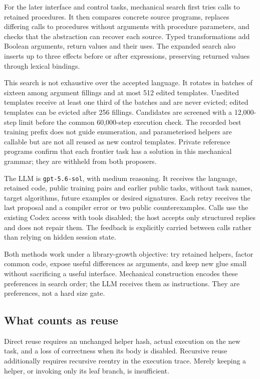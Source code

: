 For the later interface and control tasks, mechanical search first tries calls
to retained procedures. It then compares concrete source programs, replaces
differing calls to procedures without arguments with procedure parameters, and
checks that the abstraction can recover each source. Typed transformations add
Boolean arguments, return values and their uses. The expanded search also
inserts up to three effects before or after expressions, preserving returned
values through lexical bindings.

This search is not exhaustive over the accepted language. It rotates in batches
of sixteen among argument fillings and at most 512 edited templates. Unedited
templates receive at least one third of the batches and are never evicted;
edited templates can be evicted after 256 fillings. Candidates are screened
with a 12,000-step limit before the common 60,000-step execution check. The
recorded best training prefix does not guide enumeration, and parameterised
helpers are callable but are not all reused as new control templates. Private
reference programs confirm that each frontier task has a solution in this
mechanical grammar; they are withheld from both proposers.

The LLM is \texttt{gpt-5.6-sol}, with medium reasoning. It receives the language,
retained code, public training pairs and earlier public tasks, without task
names, target algorithms, future examples or desired signatures. Each retry
receives the last proposal and a compiler error or two public counterexamples.
Calls use the existing Codex access with tools disabled; the host accepts only
structured replies and does not repair them. The feedback is explicitly carried
between calls rather than relying on hidden session state.

Both methods work under a library-growth objective: try retained helpers,
factor common code, expose useful differences as arguments, and keep new glue
small without sacrificing a useful interface. Mechanical construction encodes
these preferences in search order; the LLM receives them as instructions.
They are preferences, not a hard size gate.

\subsection{What counts as reuse}

Direct reuse requires an unchanged helper hash, actual execution on the new
task, and a loss of correctness when its body is disabled. Recursive reuse
additionally requires recursive reentry in the execution trace. Merely keeping
a helper, or invoking only its leaf branch, is insufficient.

